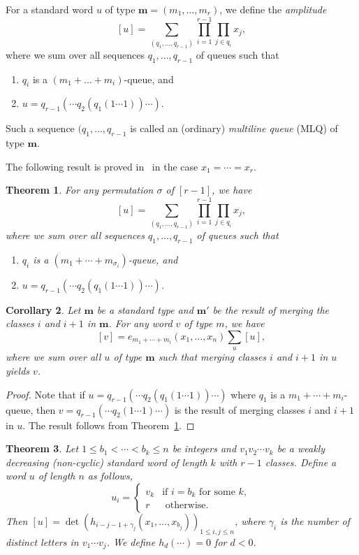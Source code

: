 \documentclass[reqno]{amsart}
\newcommand{\0}{\phantom{c}}
\newcommand{\mm}{\mathbf{m}}
\let\sumnonlimits\sum
\let\prodnonlimits\prod
\renewcommand{\sum}{\sumnonlimits\limits}
\renewcommand{\prod}{\prodnonlimits\limits}
\newcommand{\defn}[1]{{\color{darkred}\emph{#1}}} %
\theoremstyle{plain}
\newtheorem{thm}{Theorem}[section]
\newtheorem{cor}[thm]{Corollary}
\theoremstyle{definition}
\numberwithin{equation}{section}
\newcommand{\erik}[1]{\todo[size=\tiny,color=green!30]{#1 \\ \hfill --- Erik}}
\begin{document}
For a standard word $u$ of type $\mm = (m_1, \dotsc, m_r)$, we define the \defn{amplitude} 
\[
  [u] = \sum_{(q_1, \dotsc, q_{r-1})} \prod_{i=1} ^{r-1} \prod_{j \in q_i} x_j,
\]
where we sum over all sequences $q_1, \dots, q_{r-1}$ of queues such that
\begin{enumerate}
\item $q_i$ is a $(m_1+\dots+m_i)$-queue, and
\item $u = q_{r-1}(\cdots q_2(q_1(1\dotsm 1)) \cdots)$.
\end{enumerate}

Such a sequence $(q_1, \dotsc, q_{r-1}$ is called an (ordinary) \defn{multiline queue} (MLQ) of type $\mm$.

The following result is proved in~\cite{AAMP} in the case $x_1 = \cdots = x_r$. \erik{our proof is different[...]}

\begin{thm}
\label{thm:permutation}
  For any permutation $\sigma$ of $[r-1]$, we have 
  \[
  [u] = \sum_{(q_1, \dots, q_{r-1})} \prod_{i=1} ^{r-1} \prod_{j\in q_i} x_j,
  \]
  where we sum over all sequences $q_1, \dotsc, q_{r-1}$ of queues such that
  \begin{enumerate}
  \item $q_i$ is a $(m_1 + \cdots + m_{\sigma_i})$-queue, and
  \item $u = q_{r-1}(\cdots q_2(q_1(1\dotsm 1)) \cdots )$.
  \end{enumerate}
\end{thm}

\begin{cor}
  Let $\mm$ be a standard type and $\mm'$ be the result of merging the classes $i$ and $i+1$ in $\mm$. For any word $v$ of type $m$, we have
  \[
  [v] = e_{m_1 + \cdots + m_i}(x_1, \dotsc, x_n) \sum_u [u],
  \]
  where we sum over all $u$ of type $\mm$ such that merging classes $i$ and $i+1$ in $u$ yields $v$.
\end{cor}

\begin{proof}
  Note that if $u = q_{r-1}(\cdots q_2(q_1(1 \dotsm 1)) \cdots)$ where $q_1$ is a $m_1 + \cdots + m_i$-queue, then $v = q_{r-1}(\cdots q_2(1\dotsm 1)\cdots)$ is the result of merging classes $i$ and $i+1$ in $u$. The result follows from Theorem~\ref{thm:permutation}.
\end{proof}

\begin{thm}
\label{thm:determinant_form}
  Let $1 \leq b_1 < \cdots < b_k \leq n$ be integers and $v_1v_2 \dotsm v_k$ be a weakly decreasing (non-cyclic) standard word of length $k$ with $r-1$ classes. Define a word $u$ of length $n$ as follows,
  \[
  u_i = \begin{cases}
  v_k & \text{if $i = b_k$ for some $k$}, \\
  r & \text{ otherwise}.
  \end{cases}
  \]
  Then $[u] = \det(h_{i-j-1+\gamma_j}(x_1, \dotsc, x_{b_j}))_{1\leq i,j\leq n}$, where $\gamma_i$ is the number of distinct letters in $v_1\dotsm v_j$. We define $h_d(\cdots) = 0$ for $d < 0$.
\end{thm}
\end{document}
